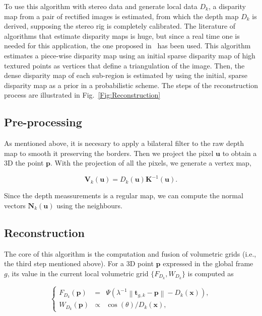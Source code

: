 To use this algorithm with stereo data and generate local data $D_k$, a disparity map from a pair of rectified images is estimated, from which the depth map $D_k$ is derived, supposing the stereo rig is completely calibrated. The literature of algorithms that estimate disparity maps is huge, but since a real time one is needed for this application, the one proposed in~\cite{Geiger2010} has been used. This algorithm estimates a piece-wise disparity map using an initial sparse disparity map of high textured points as vertices that define a triangulation of the image. Then, the dense disparity map of each sub-region is estimated by using the initial, sparse disparity map as a prior in a probabilistic scheme. The steps of the reconstruction process are illustrated in Fig.~\ref{Fig:Reconstruction}

\subsection{Pre-processing}
As mentioned above, it is necesary to apply a bilateral filter to the raw depth map to smooth it preserving the borders.
Then we project the pixel $\mathbf{u}$ to obtain a 3D the point $\mathbf{p}$. With the projection of all the pixels, we generate a vertex map,

\begin{equation}
 \mathbf{V}_k(\mathbf{u}) = D_k(\mathbf{u})\mathbf{K}^{-1}(\mathbf{u}).
\end{equation}

Since the depth meassurements is a regular map, we can compute the normal vectors $\mathbf{N}_k(\mathbf{u})$ using the neighbours.



\subsection{Reconstruction}
The core of this algorithm is the computation and fusion of volumetric grids (i.e., the third step mentioned above). For a 3D point $\mathbf{p}$ expressed in the global frame $g$, its value in the current local volumetric grid $\{F_{D_k},W_{D_k}\}$ is computed as

$$
\left\{
\begin{array}{ccc}
F_{D_{k}}(\mathbf{p}) &=& \Psi (\lambda^{-1} \left \| \mathbf{t}_{g,k} - \mathbf{p}\right \| - D_k(\mathbf{x})), \\
W_{D_{k}}(\mathbf{p}) &\propto& \cos(\theta)/D_{k}(\mathbf{x}),
\end{array}
\right.
$$

